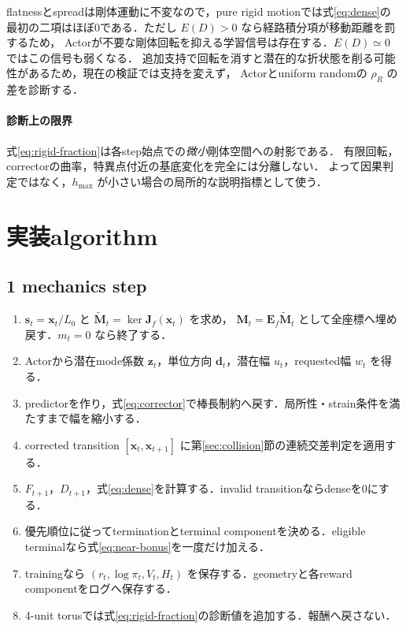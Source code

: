 \documentclass[a4paper,11pt]{ltjsarticle}
\begin{document}
flatnessとspreadは剛体運動に不変なので，pure rigid motionでは式\eqref{eq:dense}の
最初の二項はほぼ0である．ただし $E(D)>0$ なら経路積分項が移動距離を罰するため，
Actorが不要な剛体回転を抑える学習信号は存在する．$E(D)\simeq0$ ではこの信号も弱くなる．
追加支持で回転を消すと潜在的な折状態を削る可能性があるため，現在の検証では支持を変えず，
Actorとuniform randomの $\rho_R$ の差を診断する．

\paragraph{診断上の限界}
式\eqref{eq:rigid-fraction}は各step始点での\emph{微小}剛体空間への射影である．
有限回転，correctorの曲率，特異点付近の基底変化を完全には分離しない．
よって因果判定ではなく，$h_{\max}$ が小さい場合の局所的な説明指標として使う．

\section{実装algorithm}

\subsection{1 mechanics step}

\begin{enumerate}
  \item $\bm s_t=\bm x_t/L_0$ と
  $\widetilde{\bm M}_t=\ker\bm J_f(\bm x_t)$ を求め，
  $\bm M_t=\bm E_f\widetilde{\bm M}_t$ として全座標へ埋め戻す．$m_t=0$ なら終了する．
  \item Actorから潜在mode係数 $\bm z_t$，単位方向 $\bm d_t$，潜在幅 $u_t$，requested幅 $w_t$ を得る．
  \item predictorを作り，式\eqref{eq:corrector}で棒長制約へ戻す．局所性・strain条件を満たすまで幅を縮小する．
  \item corrected transition $[\bm x_t,\bm x_{t+1}]$ に第\ref{sec:collision}節の連続交差判定を適用する．
  \item $F_{t+1}$，$D_{t+1}$，式\eqref{eq:dense}を計算する．invalid transitionならdenseを0にする．
  \item 優先順位に従ってterminationとterminal componentを決める．eligible terminalなら式\eqref{eq:near-bonus}を一度だけ加える．
  \item trainingなら $(r_t,\log\pi_t,V_t,H_t)$ を保存する．geometryと各reward componentをログへ保存する．
  \item 4-unit torusでは式\eqref{eq:rigid-fraction}の診断値を追加する．報酬へ戻さない．
\end{enumerate}
\end{document}
